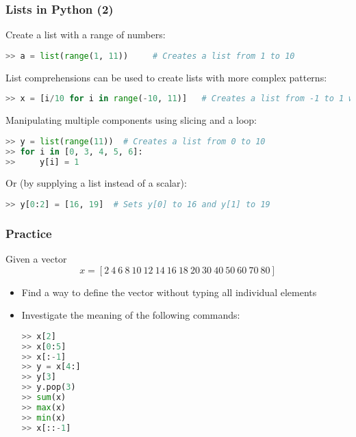  \begin{frame}[fragile]
   \frametitle{Lists in Python (2)}
   Create a list with a range of numbers:
   \begin{lstlisting}[language=Python,numbers=none]
>> a = list(range(1, 11))     # Creates a list from 1 to 10
   \end{lstlisting}\pause
   List comprehensions can be used to create lists with more complex patterns:
   \begin{lstlisting}[language=Python,numbers=none]
>> x = [i/10 for i in range(-10, 11)]   # Creates a list from -1 to 1 with a step of 0.1
   \end{lstlisting}\pause
   Manipulating multiple components using slicing and a loop:
   \begin{lstlisting}[language=Python,numbers=none]
>> y = list(range(11))  # Creates a list from 0 to 10
>> for i in [0, 3, 4, 5, 6]: 
>>     y[i] = 1
   \end{lstlisting}\pause
   Or (by supplying a list instead of a scalar):
   \begin{lstlisting}[language=Python,numbers=none]
>> y[0:2] = [16, 19]  # Sets y[0] to 16 and y[1] to 19
   \end{lstlisting}
 \end{frame}
 

\begin{frame}[fragile]
 \frametitle{Practice}
 Given a vector 
 \[ 
    x = \left[2 \ 4 \ 6 \ 8 \ 10 \ 12 \ 14 \ 16 \ 18 \ 20 \ 30 \ 40 \ 50 \ 60 \ 70 \ 80 \right]
 \]
 \begin{itemize}
  \item Find a way to define the vector without typing all individual elements\pause
  \item Investigate the meaning of the following commands:
  \begin{lstlisting}[language=Python, numbers=none]
>> x[2]            
>> x[0:5]          
>> x[:-1]          
>> y = x[4:]       
>> y[3]            
>> y.pop(3)      
>> sum(x)    
>> max(x)       
>> min(x) 
>> x[::-1]       
    \end{lstlisting}    
 \end{itemize}
\end{frame}

